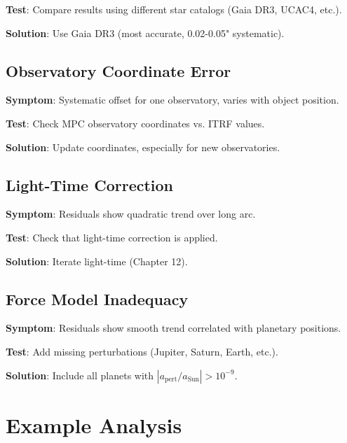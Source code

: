\textbf{Test}: Compare results using different star catalogs (Gaia DR3, UCAC4, etc.).

\textbf{Solution}: Use Gaia DR3 (most accurate, 0.02-0.05" systematic).

\subsection{Observatory Coordinate Error}

\textbf{Symptom}: Systematic offset for one observatory, varies with object position.

\textbf{Test}: Check MPC observatory coordinates vs. ITRF values.

\textbf{Solution}: Update coordinates, especially for new observatories.

\subsection{Light-Time Correction}

\textbf{Symptom}: Residuals show quadratic trend over long arc.

\textbf{Test}: Check that light-time correction is applied.

\textbf{Solution}: Iterate light-time (Chapter 12).

\subsection{Force Model Inadequacy}

\textbf{Symptom}: Residuals show smooth trend correlated with planetary positions.

\textbf{Test}: Add missing perturbations (Jupiter, Saturn, Earth, etc.).

\textbf{Solution}: Include all planets with $|a_{\text{pert}}/a_{\text{Sun}}| > 10^{-9}$.

\section{Example Analysis}

